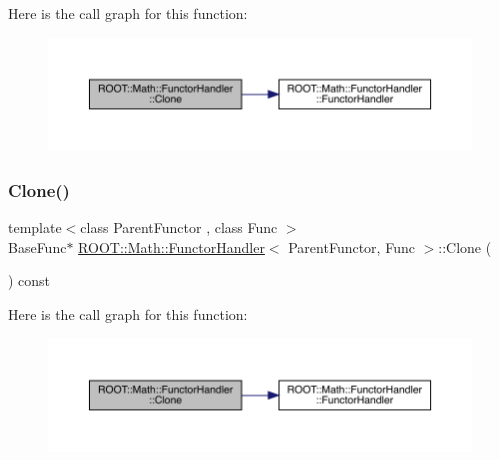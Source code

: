 Here is the call graph for this function\+:
\nopagebreak
\begin{figure}[H]
\begin{center}
\leavevmode
\includegraphics[width=350pt]{d8/d4b/classROOT_1_1Math_1_1FunctorHandler_ad20fb7defe76e6abc244eff203aabbc6_cgraph}
\end{center}
\end{figure}
\mbox{\label{classROOT_1_1Math_1_1FunctorHandler_ad20fb7defe76e6abc244eff203aabbc6}} 
\subsubsection{\texorpdfstring{Clone()}{Clone()}\hspace{0.1cm}{\footnotesize\ttfamily [3/3]}}
{\footnotesize\ttfamily template$<$class Parent\+Functor , class Func $>$ \\
Base\+Func$\ast$ \mbox{\hyperlink{classROOT_1_1Math_1_1FunctorHandler}{R\+O\+O\+T\+::\+Math\+::\+Functor\+Handler}}$<$ Parent\+Functor, Func $>$\+::Clone (\begin{DoxyParamCaption}{ }\end{DoxyParamCaption}) const\hspace{0.3cm}{\ttfamily [inline]}}

Here is the call graph for this function\+:
\nopagebreak
\begin{figure}[H]
\begin{center}
\leavevmode
\includegraphics[width=350pt]{d8/d4b/classROOT_1_1Math_1_1FunctorHandler_ad20fb7defe76e6abc244eff203aabbc6_cgraph}
\end{center}
\end{figure}
\mbox{\label{classROOT_1_1Math_1_1FunctorHandler_a448b3a68a8b9a55489a0b33b4cb26c93}} 
